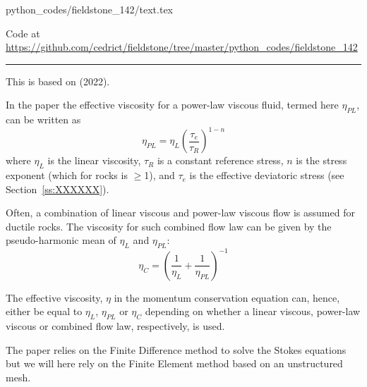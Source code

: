 
\begin{flushright} {\tiny {\color{gray} python\_codes/fieldstone\_142/text.tex}} \end{flushright}



\begin{center}

Code at \url{https://github.com/cedrict/fieldstone/tree/master/python_codes/fieldstone_142}
\end{center}

\par\noindent\rule{\textwidth}{0.4pt}

This \stone is based on \textcite{hams22} (2022).

In the paper the effective viscosity for a power-law viscous fluid, termed here $\eta_{PL}$, can be written
as
\[
\eta_{PL}=\eta_L \left( \frac{\tau_e}{\tau_R}  \right)^{1-n}
\]
where $\eta_L$ is the linear viscosity, $\tau_R$ is a constant reference stress, 
$n$ is the stress exponent (which for rocks is $\ge$1), and $\tau_e$ is the effective 
deviatoric stress (see Section~\ref{ss:XXXXXX}).

Often, a combination of linear viscous and power-law viscous flow is
assumed for ductile rocks. The viscosity for such combined flow law can
be given by the pseudo-harmonic mean of $\eta_L$ and $\eta_{PL}$:
\[
\eta_C = \left(  \frac{1}{\eta_L} + \frac{1}{\eta_{PL}} \right)^{-1}
\]

The effective viscosity, $\eta$ in the momentum conservation equation can, hence, either be
equal to $\eta_L$, $\eta_{PL}$ or $\eta_C$ depending on whether a linear viscous, power-law
viscous or combined flow law, respectively, is used.

The paper relies on the Finite Difference method to solve the Stokes equations but we will here 
rely on the Finite Element method based on an unstructured mesh.


